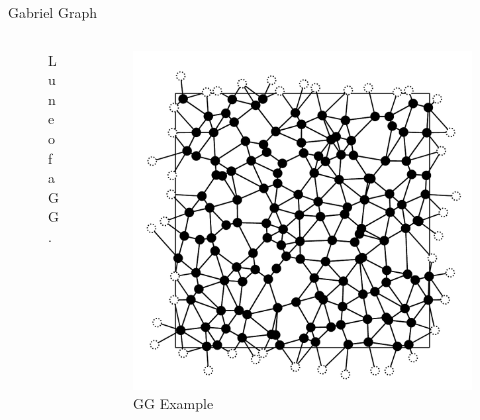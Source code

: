 \documentclass{beamer}
\begin{document}
        \begin{frame}{Gabriel Graph}
            \begin{columns}[b]
                \begin{column}{5cm}
                    \begin{figure}[htbp]
                        \centering
                        
                        \caption
                        {
                            Lune of a GG.
                        }
                    \end{figure}
                \end{column}
                \begin{column}{5cm}
                    \begin{figure}[htbp]
                        \centering
                        \includegraphics[width=1\textwidth]{images/GG/L12S03.pdf}
                        \caption
                        {
                            GG Example
                        }
                    \end{figure}
                \end{column}
            \end{columns}
        \end{frame}
\end{document}
